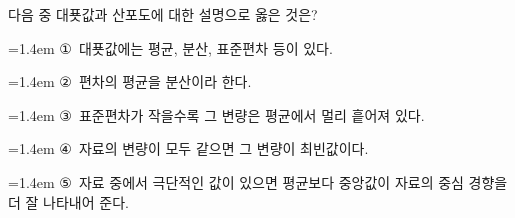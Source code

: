 다음 중 대푯값과 산포도에 대한 설명으로 옳은 것은?
\par\medskip\par\noindent\hangindent=1.4em {\small ①}\ 대푯값에는 평균, 분산, 표준편차 등이 있다.\par\noindent\hangindent=1.4em {\small ②}\ 편차의 평균을 분산이라 한다.\par\noindent\hangindent=1.4em {\small ③}\ 표준편차가 작을수록 그 변량은 평균에서 멀리 흩어져 있다.\par\noindent\hangindent=1.4em {\small ④}\ 자료의 변량이 모두 같으면 그 변량이 최빈값이다.\par\noindent\hangindent=1.4em {\small ⑤}\ 자료 중에서 극단적인 값이 있으면 평균보다 중앙값이 자료의 중심 경향을 더 잘 나타내어 준다.\par\medskip
